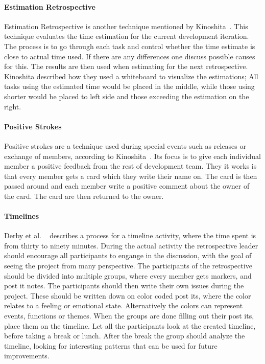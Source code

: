 \documentclass[12pt]{article}
\begin{document}
\paragraph{Estimation Retrospective}
Estimation Retrospective is another technique mentioned by Kinoshita~\cite{Kinoshita2008}. This technique evaluates the time estimation for the current development iteration. The process is to go through each task and control whether the time estimate is close to actual time used. If there are any differences one discuss possible causes for this. The results are then used when estimating for the next retrospective. Kinoshita described how they used a whiteboard to visualize the estimations; All tasks using the estimated time would be placed in the middle, while those using shorter would be placed to left side and those exceeding the estimation on the right. 

\paragraph{Positive Strokes}
Positive strokes are a technique used during special events such as releases or exchange of members, according to Kinoshita~\cite{Kinoshita2008}. Its focus is to give each individual member a positive feedback from the rest of development team. They it works is that every member gets a card which they write their name on. The card is then passed around and each member write a positive comment about the owner of the card. The card are then returned to the owner. 

\paragraph{Timelines}

Derby et al. ~\cite{Derby2007} describes a process for a timeline activity, where the time spent is from thirty to ninety minutes. During the actual activity the retrospective leader should encourage all participants to engange in the discussion, with the goal of seeing the project from many perspective. The participants of the retrospective should be divided into multiple groups, where every member gets markers, and post it notes. The participants should then write their own issues during the project. These should be written down on color coded post its, where the color relates to a feeling or emotional state. Alternatively  the colors can represent events, functions or themes. When the groups are done filling out their post its, place them on the timeline. Let all the participants look at the created timeline, before taking a break or lunch. After the break the group should analyze the timeline, looking for interesting patterns that can be used for future improvements.
\end{document}
